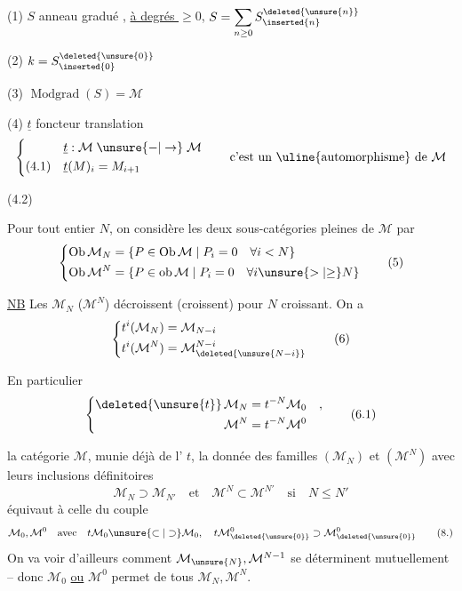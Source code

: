 (1) $S$ anneau gradué , \uline{à degrés $\geq0$}, $\displaystyle S=\sum_{n\geq0} S_{\inserted{n}}^{\deleted{\unsure{n}}}$


(2) $k=S_{\inserted{0}}^{\deleted{\unsure{0}}}$

(3) $\operatorname{Modgrad}(S)=\mathcal M$

(4) $\underline t$ foncteur translation
\[
\left\{\begin{aligned}
&\underline t:\mathcal M\mathrel{\unsure{-|\to}}\mathcal M\\
(4.1)\quad &\underline t(M)_i=M_{i+1}
\end{aligned}\right.
\qquad\text{c'est un \uline{automorphisme} de $\mathcal M$}
\]

(4.2)   

Pour tout entier $N$, on considère les deux sous-catégories  pleines  de $\mathcal M$  par
\[
\left\{\begin{aligned}
\operatorname{Ob}\mathcal M_N&=\{P\in\operatorname{Ob}\mathcal M\mid P_i=0\quad\forall i<N\}\\
\operatorname{Ob}\mathcal M^{N}&=\{P\in\operatorname{ob}\mathcal M\mid P_i=0\quad\forall i\unsure{>|{\geq}}N\}
\end{aligned}\right.\tag*{(5)}
\]

\uline{NB} Les $\mathcal M_N$ ($\mathcal M^{N}$) décroissent (croissent) pour $N$ croissant. On a
\[
\left\{\begin{aligned}
t^{i}(\mathcal M_N)&=\mathcal M_{N-i}\\
t^{i}(\mathcal M^{N})&=\mathcal M_{\deleted{\unsure{N-i}}}^{N-i}
\end{aligned}\right.\tag*{(6)}
\]

En particulier 
\[
\left\{\begin{aligned}
\deleted{\unsure{t}}\,\mathcal M_N&=t^{-N}\mathcal M_0\quad,\\
\mathcal M^{N}&=t^{-N}\mathcal M^{0}
\end{aligned}\right.\tag*{(6.1)}
\]

 la catégorie $\mathcal M$, munie déjà de l' $t$, la donnée des familles $(\mathcal M_N)$ et $(\mathcal M^N)$ avec leurs inclusions définitoires
\[
\mathcal M_N\supset\mathcal M_{N'}\quad\text{et}\quad \mathcal M^N\subset\mathcal M^{N'}\quad\text{si}\quad N\leq N'\tag*{(7)}
\]
équivaut à celle  du couple
\[
\mathcal M_0,\mathcal M^0\quad\text{avec}\quad t\mathcal M_0\unsure{\subset|\supset}\mathcal M_0,\quad t\mathcal M_{\deleted{\unsure{0}}}^{0}\supset\mathcal M_{\deleted{\unsure{0}}}^{0}\tag*{(8.)}
\]
On va voir d'ailleurs comment $\mathcal M_{\unsure{N}},\mathcal M^{N-1}$  se déterminent mutuellement -- donc $\mathcal M_0$ \uline{ou} $\mathcal M^0$ permet de  tous  $\mathcal M_N,\mathcal M^N$.
